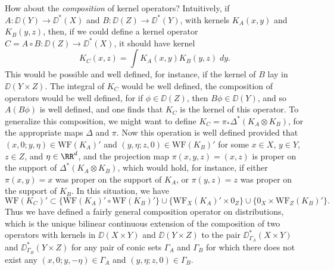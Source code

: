 How about the \emph{composition} of kernel operators? Intuitively, if $A: \DD(Y) \to \DD^*(X)$ and $B: \DD(Z) \to \DD^*(Y)$, with kernels $K_A(x,y)$ and $K_B(y,z)$, then, if we could define a kernel operator $C = A \circ B: \DD(Z) \to \DD^*(X)$, it should have kernel
%
\[ K_C(x,z) = \int K_A(x,y) K_B(y,z)\; dy. \]
%
This would be possible and well defined, for instance, if the kernel of $B$ lay in $\DD(Y \times Z)$. The integral of $K_C$ would be well defined, the composition of operators would be well defined, for if $\phi \in \DD(Z)$, then $B\phi \in \DD(Y)$, and so $A(B\phi)$ is well defined, and one finds that $K_C$ is the kernel of this operator. To generalize this composition, we might want to define $K_C = \pi_* \Delta^*(K_A \otimes K_B)$, for the appropriate maps $\Delta$ and $\pi$. Now this operation is well defined provided that $(x,0;y,\eta) \in \text{WF}(K_A)'$ and $(y,\eta;z,0) \in \text{WF}(K_B)'$ for some $x \in X$, $y \in Y$, $z \in Z$, and $\eta \in \RR^d$, and the projection map $\pi(x,y,z) = (x,z)$ is proper on the support of $\Delta^* (K_A \otimes K_B)$, which would hold, for instance, if either $\pi(x,y) = x$ was proper on the support of $K_A$, or $\pi(y,z) = z$ was proper on the support of $K_B$. In this situation, we have
%
\[ \text{WF}(K_C)' \subset \{ \text{WF}(K_A)' \circ \text{WF}(K_B)' \} \cup \{ \text{WF}_X(K_A)' \times 0_Z \} \cup \{ 0_X \times \text{WF}_Z(K_B)' \}. \]
%
Thus we have defined a fairly general composition operator on distributions, which is the unique bilinear continuous extension of the composition of two operators with kernels in $\DD(X \times Y)$ and $\DD(Y \times Z)$ to the pair $\DD_{\Gamma_A}^*(X \times Y)$ and $\DD_{\Gamma_B}^*(Y \times Z)$ for any pair of conic sets $\Gamma_A$ and $\Gamma_B$ for which there does not exist any $(x,0;y,-\eta) \in \Gamma_A$ and $(y,\eta;z,0) \in \Gamma_B$.



